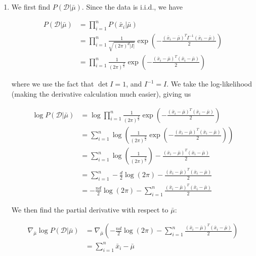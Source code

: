 \documentclass[11pt]{article}
\begin{document}
		\begin{enumerate}
		    \item We first find $P(\mathcal{D} | \bar{\mu})$. Since the data is i.i.d., we have 
		    
		    \begin{align*}
		        P(\mathcal{D} | \bar{\mu}) &= \prod_{i=1}^n P(\bar{x}_i | \bar{\mu}) \\ 
		        &= \prod_{i=1}^n \frac{1}{\sqrt{\left ( 2 \pi \right )^d |I|}} \exp \left ( -\frac{\left ( \bar{x}_i - \bar{\mu} \right )^TI^{-1} \left ( \bar{x}_i - \bar{\mu} \right )}{2} \right ) \\
		        &= \prod_{i=1}^n \frac{1}{\left ( 2 \pi \right ) ^{\frac{d}{2}}} \exp \left (-\frac{\left ( \bar{x}_i - \bar{\mu} \right )^T\left ( \bar{x}_i - \bar{\mu} \right )}{2} \right )
		    \end{align*}
		    
		   where we use the fact that $\det I = 1$, and $I^{-1} = I$. 
		   We take the log-likelihood (making the derivative calculation much easier), giving us 
		    
		    \begin{align*}
		        \log P(\mathcal{D} | \bar{\mu}) &= \log \prod_{i=1}^n \frac{1}{\left ( 2 \pi \right ) ^{\frac{d}{2}}} \exp \left (-\frac{\left ( \bar{x}_i - \bar{\mu} \right )^T\left ( \bar{x}_i - \bar{\mu} \right )}{2} \right ) \\ 
		        &= \sum_{i=1}^n \log \left ( \frac{1}{\left ( 2 \pi \right ) ^{\frac{d}{2}}} \exp \left (-\frac{\left ( \bar{x}_i - \bar{\mu} \right )^T\left ( \bar{x}_i - \bar{\mu} \right )}{2} \right ) \right ) \\
		        &= \sum_{i=1}^n \log \left (\frac{1}{\left ( 2 \pi \right ) ^{\frac{d}{2}}} \right ) -\frac{\left ( \bar{x}_i - \bar{\mu} \right )^T\left ( \bar{x}_i - \bar{\mu} \right )}{2} \\
		        &= \sum_{i=1}^n -\frac{d}{2} \log \left ( 2 \pi \right )  -\frac{\left ( \bar{x}_i - \bar{\mu} \right )^T\left ( \bar{x}_i - \bar{\mu} \right )}{2} \\
		        &= -\frac{nd}{2} \log(2\pi) - \sum_{i=1}^n \frac{\left ( \bar{x}_i - \bar{\mu} \right )^T\left ( \bar{x}_i - \bar{\mu} \right )}{2} 
		    \end{align*}
		    
		    We then find the partial derivative with respect to $\bar{\mu}$:
		    
		    \begin{align*}
		        \nabla_{\bar{\mu}} \log P(\mathcal{D} | \bar{\mu}) &= \nabla_{\bar{\mu}} \left ( -\frac{nd}{2} \log(2\pi) - \sum_{i=1}^n \frac{\left ( \bar{x}_i - \bar{\mu} \right )^T\left ( \bar{x}_i - \bar{\mu} \right )}{2} \right ) \\
		        &= \sum_{i=1}^n \bar{x}_i - \bar{\mu} 
		    \end{align*}
		    

\end{enumerate}
\end{document}
